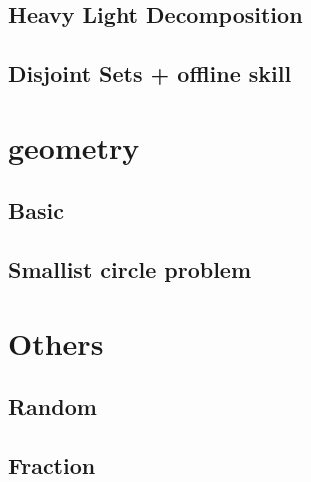 \documentclass[12pt,twocolumn,oneside]{article}
\begin{document}
\subsection{Heavy Light Decomposition}


\subsection{Disjoint Sets + offline skill}


\section{geometry}
\subsection{Basic}


\subsection{Smallist circle problem}


\section{Others}
\subsection{Random}


\subsection{Fraction}

\end{document}
